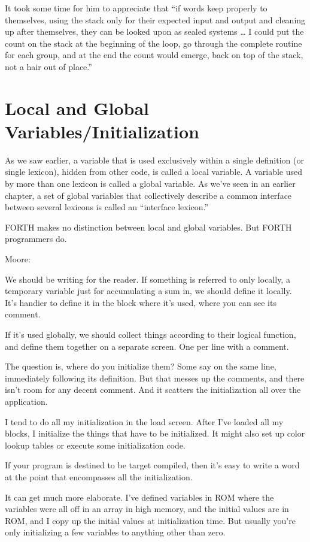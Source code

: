 It took some time for him to appreciate that ``if words keep properly
to themselves, using the stack only for their expected input and output
and cleaning up after themselves, they can be looked upon as sealed
systems \dots{} I could put the count on the stack at the beginning of the
loop, go through the complete routine for each group, and at the end the
count would emerge, back on top of the stack, not a hair out of place.''

\section{Local and Global Variables/Initialization}

As we saw earlier, a variable that is used exclusively within a single
definition (or single lexicon), hidden from other code, is called a local
variable. A variable used by more than one lexicon is called a global
variable. As we've seen in an earlier chapter, a set of global variables that
collectively describe a common interface between several lexicons is
called an ``interface lexicon.''

FORTH makes no distinction between local and global variables.
But FORTH programmers do.

\bigskip\blackline{2ex}
\noindent Moore:

\begin{tfquot}
We should be writing for the reader. If something is referred to only locally,
a temporary variable just for accumulating a sum in, we should define it
locally. It's handier to define it in the block where it's used, where you can
see its comment.

If it's used globally, we should collect things according to their logical
function, and define them together on a separate screen. One per line with a
comment.

The question is, where do you initialize them? Some say on the same line,
immediately following its definition. But that messes up the comments,
and there isn't room for any decent comment. And it scatters the
initialization all over the application.

I tend to do all my initialization in the load screen. After I've loaded all my
blocks, I initialize the things that have to be initialized. It might also set
up color lookup tables or execute some initialization code.

If your program is destined to be target compiled, then it's easy to write a
word at the point that encompasses all the initialization.

It can get much more elaborate. I've defined variables in ROM where the
variables were all off in an array in high memory, and the initial values are
in ROM, and I copy up the initial values at initialization time. But usually
you're only initializing a few variables to anything other than zero.
\end{tfquot}
\blackline{1ex}


